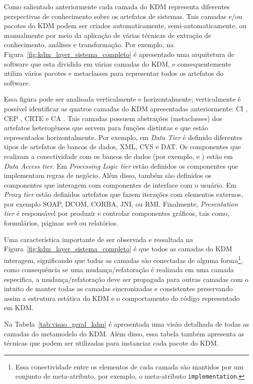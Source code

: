 Como salientado anteriormente cada camada do KDM representa diferentes perspectivas de conhecimento sobre os artefatos de sistemas. Tais camadas e/ou pacotes do KDM podem ser criados automaticamente, semi-automaticamente, ou manualmente por meio da aplicação de várias técnicas de extração de conhecimento, análises e transformação. Por exemplo, na Figura~\ref{fig:kdm_layer_sistema_completo} é apresentado uma arquitetura de software que esta dividida em várias camadas do KDM, e consequentemente utiliza vários pacotes e metaclasses para representar todos os artefatos do software. 

Essa figura pode ser analisada verticalmente e horizontalmente; verticalmente é possível identificar as quatros camadas do KDM apresentadas anteriormente: CI , CEP , CRTE  e CA . Tais camadas possuem abstrações (metaclasses) dos artefatos heterogêneos que servem para funções distintas e que estão representados horizontalmente. Por exemplo, em \emph{Data Tier} é definido diferentes tipos de artefatos de bancos de dados, XML, CVS e DAT. Os componentes que realizam a conectividade com os bancos de dados (por exemplo,  e ) estão em \emph{Data Access tier}. Em \emph{Processing Logic tier} estão definidos os componentes que implementam regras de negócio. Além disso, também são definidos os componentes que interagem com componentes de interface com o usuário. Em \emph{Proxy tier} estão definidos artefatos que fazem iterações com elementos externos, por exemplo SOAP, DCOM, CORBA, JNI, ou RMI. Finalmente, \emph{Presentation tier} é responsável por produzir e controlar componentes gráficos, tais como, formulários, páginas \emph{web} ou relatórios. 

Uma característica importante de ser observada e ressaltada na Figura~\ref{fig:kdm_layer_sistema_completo} é que todos as camadas do KDM interagem, significando que todas as camadas são conectadas de alguma forma\footnote{Essa conectividade entre os elementos de cada camada são mantidos por um conjunto de meta-atributo, por exemplo, o meta-atributo \texttt{implementation}.}, como consequência se uma mudança/refatoração é realizada em uma camada especifica, a mudança/refatoração deve ser propagada para outras camadas com o intuito de manter todas as camadas sincronizadas e consistentes preservando assim a estrutura estática do KDM e o comportamento do código representado em KDM.

Na Tabela~\ref{tab:visao_geral_kdm} é apresentada uma visão detalhada de todas as camadas do metamodelo do KDM. Além disso, essa tabela também apresenta as técnicas que podem ser utilizadas para instanciar cada pacote do KDM. 

